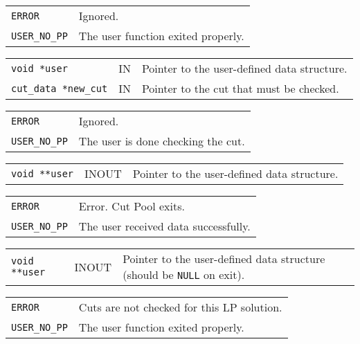 \documentclass[twoside,11pt]{article}
\begin{document}
{\newpage
\clearpage
\samepage \begin{tabular}{lp{300pt}}
{\tt ERROR} & Ignored. \\ 
{\tt USER\_NO\_PP} & The user function exited properly. \\ 
\end{tabular}
}

{\newpage
\clearpage
\samepage \begin{tabular}{llp{280pt}}
{\tt void *user} & IN & Pointer to the user-defined data structure. \\ 
{\tt cut\_data *new\_cut} & IN & Pointer to the cut that must be
checked. \\ 
\end{tabular}
}

{\newpage
\clearpage
\samepage \begin{tabular}{lp{300pt}}
{\tt ERROR} & Ignored. \\ 
{\tt USER\_NO\_PP} & The user is done checking the cut. \\ 
\end{tabular}
}

{\newpage
\clearpage
\samepage \begin{tabular}{llp{280pt}}
{\tt void **user} & INOUT & Pointer to the user-defined data structure. \\ 
\end{tabular}
}

{\newpage
\clearpage
\samepage \begin{tabular}{lp{300pt}}
{\tt ERROR} & Error. Cut Pool exits. \\ 
{\tt USER\_NO\_PP} & The user received data successfully. \\ 
\end{tabular}
}

{\newpage
\clearpage
\samepage \begin{tabular}{llp{280pt}}
{\tt void **user} & INOUT & Pointer to the user-defined data structure
(should be {\tt NULL} on exit). \\ 
\end{tabular}
}

{\newpage
\clearpage
\samepage \begin{tabular}{lp{300pt}}
{\tt ERROR} & Cuts are not checked for this LP solution. \\ 
{\tt USER\_NO\_PP} & The user function exited properly. \\ 
\end{tabular}
}
\end{document}
